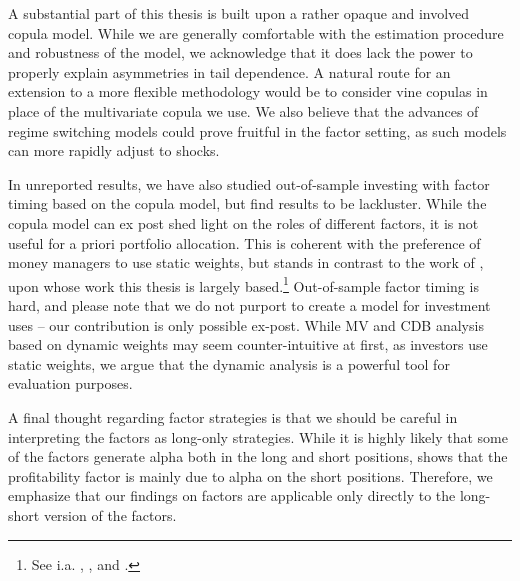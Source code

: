 A substantial part of this thesis is built upon a rather opaque and involved copula model. While we are generally comfortable with the estimation procedure and robustness of the model, we acknowledge that it does lack the power to properly explain asymmetries in tail dependence. A natural route for an extension to a more flexible methodology would be to consider vine copulas in place of the multivariate copula we use. We also believe that the advances of regime switching models could prove fruitful in the factor setting, as such models can more rapidly adjust to shocks.

In unreported results, we have also studied out-of-sample investing with factor timing based on the copula model, but find results to be lackluster. While the copula model can ex post shed light on the roles of different factors, it is not useful for a priori portfolio allocation. This is coherent with the preference of money managers to use static weights, but stands in contrast to the work of \textcite{ChristoffersenLanglois2013}, upon whose work this thesis is largely based.\footnote{See i.a. \textcite{AQRSiren}, \textcite{BlackRock}, \textcite{MSCI} and \textcite{Robeco}.} Out-of-sample factor timing is hard, and please note that we do not purport to create a model for investment uses -- our contribution is only possible ex-post. While MV and CDB analysis based on dynamic weights may seem counter-intuitive at first, as investors use static weights, we argue that the dynamic analysis is a powerful tool for evaluation purposes.

A final thought regarding factor strategies is that we should be careful in interpreting the factors as long-only strategies. While it is highly likely that some of the factors generate alpha both in the long and short positions, \textcite{Wang2013} shows that the profitability factor is mainly due to alpha on the short positions. Therefore, we emphasize that our findings on factors are applicable only directly to the long-short version of the factors.
